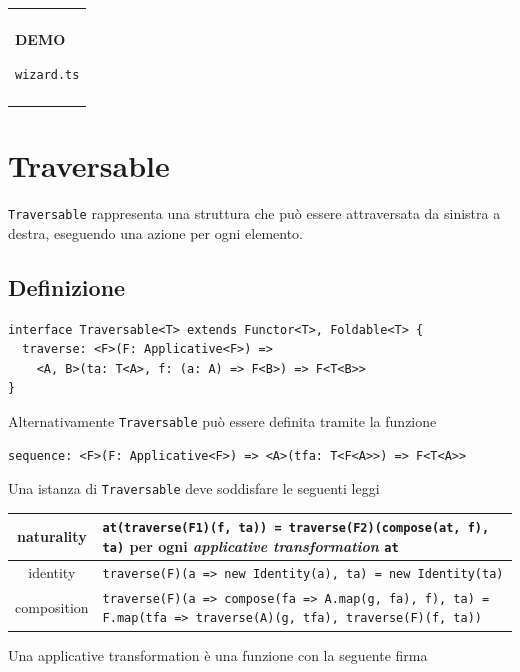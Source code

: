\documentclass[12pt]{article}
\newenvironment{demo}
    {\begin{center}
    \begin{tabular}{|p{0.9\textwidth}|}
    \hline\\
    }
    {
    \\\\\hline
    \end{tabular}
    \end{center}
    }
\begin{document}
\begin{demo}
\begin{center}
\textbf{DEMO}

\texttt{wizard.ts}
\end{center}
\end{demo}

\newpage

\section{Traversable}

\texttt{Traversable} rappresenta una struttura che può essere attraversata da sinistra a destra, eseguendo una azione per ogni elemento.

\subsection{Definizione}

\begin{verbatim}
interface Traversable<T> extends Functor<T>, Foldable<T> {
  traverse: <F>(F: Applicative<F>) =>
    <A, B>(ta: T<A>, f: (a: A) => F<B>) => F<T<B>>
}
\end{verbatim}

Alternativamente \texttt{Traversable} può essere definita tramite la funzione

\begin{verbatim}
sequence: <F>(F: Applicative<F>) => <A>(tfa: T<F<A>>) => F<T<A>>
\end{verbatim}

Una istanza di \texttt{Traversable} deve soddisfare le seguenti leggi

\begin{center}
\bgroup
\def\arraystretch{1.5}
\begin{tabular}{ |c|p{10cm}| }
\hline
naturality & \texttt{at(traverse(F1)(f, ta)) = traverse(F2)(compose(at, f), ta)} per ogni \emph{applicative transformation} \texttt{at} \\
\hline
identity & \texttt{traverse(F)(a => new Identity(a), ta) = new Identity(ta)} \\
\hline
composition & \texttt{traverse(F)(a => compose(fa => A.map(g, fa), f), ta) = F.map(tfa => traverse(A)(g, tfa), traverse(F)(f, ta))} \\
\hline
\end{tabular}
\egroup
\end{center}

Una applicative transformation è una funzione con la seguente firma
\end{document}
